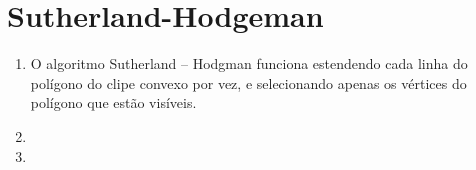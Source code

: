 \section*{Sutherland-Hodgeman}

  \begin{enumerate}[label=\arabic*)]\addtocounter{enumi}{31}
   
   		\item 
   		O algoritmo Sutherland – Hodgman funciona estendendo cada linha do polígono do clipe convexo por vez, e selecionando apenas os vértices do polígono que estão visíveis.
       \item 
 			  
       \item 
       
   \end{enumerate}
